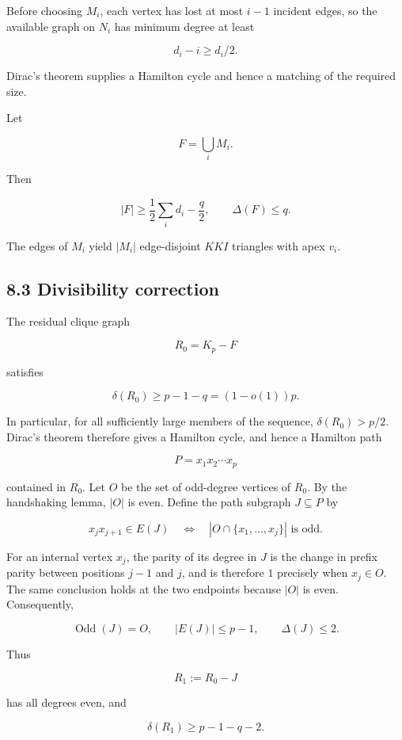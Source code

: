 \documentclass[11pt,a4paper]{article}
\begin{document}
Before choosing \(M_i\), each vertex has lost at most \(i-1\) incident edges, so the available graph on \(N_i\) has minimum degree at least

\[
d_i-i\ge d_i/2.
\]

Dirac's theorem supplies a Hamilton cycle and hence a matching of the required size.

Let

\[
F=\bigcup_iM_i.
\]

Then

\[
|F|
\ge
\frac12\sum_i d_i-\frac q2,
\qquad
\Delta(F)\le q.
\tag{8.3}
\]

The edges of \(M_i\) yield \(|M_i|\) edge-disjoint \(KKI\) triangles with apex \(v_i\).

\subsection{8.3 Divisibility correction}\label{divisibility-correction}

The residual clique graph

\[
R_0=K_p-F
\]

satisfies

\[
\delta(R_0)
\ge
p-1-q
=(1-o(1))p.
\tag{8.4}
\]

In particular, for all sufficiently large members of the sequence, \(\delta(R_0)>p/2\). Dirac's theorem therefore gives a Hamilton cycle, and hence a Hamilton path

\[
P=x_1x_2\cdots x_p
\]

contained in \(R_0\). Let \(O\) be the set of odd-degree vertices of \(R_0\). By the handshaking lemma, \(|O|\) is even. Define the path subgraph \(J\subseteq P\) by

\[
x_jx_{j+1}\in E(J)
\quad\Longleftrightarrow\quad
|O\cap\{x_1,\ldots,x_j\}|\text{ is odd}.
\tag{8.5}
\]

For an internal vertex \(x_j\), the parity of its degree in \(J\) is the change in prefix parity between positions \(j-1\) and \(j\), and is therefore \(1\) precisely when \(x_j\in O\). The same conclusion holds at the two endpoints because \(|O|\) is even. Consequently,

\[
\operatorname{Odd}(J)=O,
\qquad
|E(J)|\le p-1,
\qquad
\Delta(J)\le2.
\tag{8.6}
\]

Thus

\[
R_1:=R_0-J
\]

has all degrees even, and

\[
\delta(R_1)\ge p-1-q-2.
\tag{8.7}
\]
\end{document}
